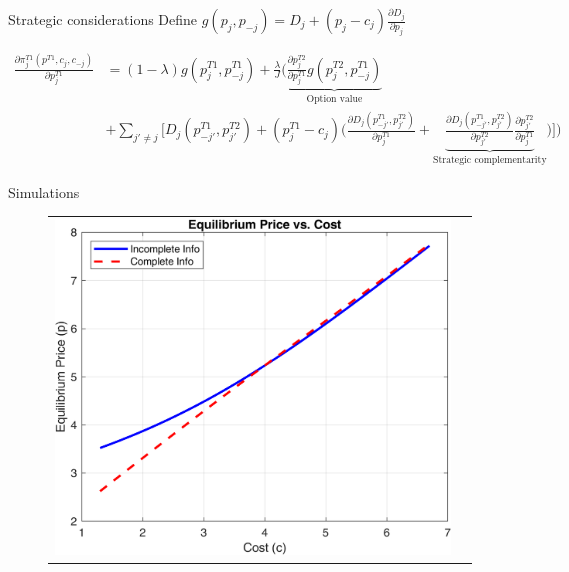 \documentclass[10pt,aspectratio=169]{beamer}
\begin{document}
\begin{frame}{Strategic considerations}
Define $g(p_j, p_{-j}) =  D_j + (p_j - c_j) \frac{\partial D_j}{\partial p_j}$

\begin{align*}
\frac{\partial \pi_j^{T1}(p^{T1}, c_j, c_{-j})}{\partial p_j^{T1}}
&= (1-\lambda) g(p_j^{T1}, p_{-j}^{T1})
+ \frac{\lambda}{J}\bigg(
\underbrace{\frac{\partial p_j^{T2}}{\partial p_j^{T1}} g(p_j^{T2}, p_{-j}^{T1})}_{\text{Option value}}
\\ &
+ \sum_{j' \ne j} \Big[
D_j(p_{-j'}^{T1}, p_{j'}^{T2}) + (p_j^{T1} - c_j)
\bigg( \frac{\partial D_j(p_{-j'}^{T1}, p_{j'}^{T2})}{\partial p_j^{T1}}
+ \underbrace{\frac{\partial D_j(p_{-j'}^{T1}, p_{j'}^{T2})}{\partial p_{j'}^{T2}}
\frac{\partial p_{j'}^{T2}}{\partial p_j^{T1}}}_{\text{Strategic complementarity}}
\bigg) \Big]
\bigg)
\end{align*}


\end{frame}


\begin{frame}{Simulations }
\begin{figure}[H]
\centering{}%
\begin{tabular}{cc}
\includegraphics[scale=0.7]{../figures/simulations/model5/pricesCI_IC.png}
\end{tabular}
\end{figure}
\end{frame}
\end{document}
